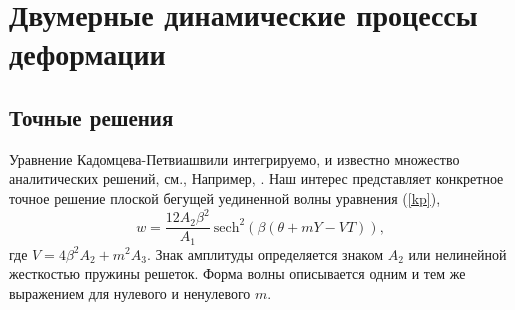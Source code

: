 \section{Двумерные динамические процессы деформации}

\subsection{Точные решения}

Уравнение Кадомцева-Петвиашвили интегрируемо, и известно множество аналитических решений, см., Например, \cite{Ablowitz}. Наш интерес представляет конкретное точное решение плоской бегущей уединенной волны уравнения (\ref {kp}),
\begin{equation}
	w=\frac{12A_2 \beta^2}{A_1}~{\text{sech}}^2\left(\beta( \theta+m Y - V T)\right), \label{solkp}
\end{equation}
где $V=4\beta^2 A_2+m^2 A_3 $. 
Знак амплитуды определяется знаком $A_2$ или нелинейной жесткостью пружины решеток. Форма волны описывается одним и тем же выражением для нулевого и ненулевого $m$.


